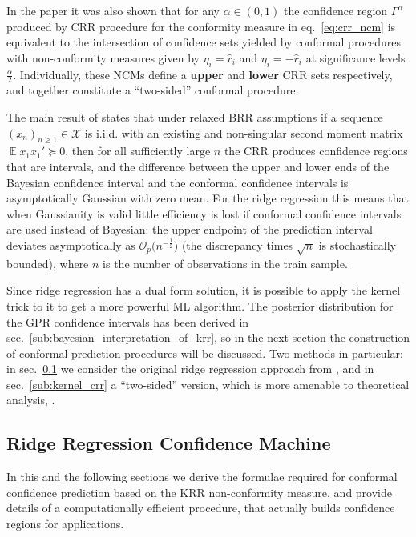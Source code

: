 \documentclass[a4paper,14pt]{extarticle}
\newcommand{\ex}{\mathop{\mathbb{E}}\nolimits}
\newcommand{\Xcal}{\mathcal{X}}
\begin{document}
In the paper it was also shown that for any $\alpha\in(0,1)$ the confidence
region $\Gamma^\alpha$ produced by CRR procedure for the conformity measure in
eq.~\ref{eq:crr_ncm} is equivalent to the intersection of confidence sets yielded
by conformal procedures with non-conformity measures given by $\eta_i = \hat{r}_i$
and $\eta_i = -\hat{r}_i$ at significance levels $\frac{\alpha}{2}$. Individually,
these NCMs define a \textbf{upper} and \textbf{lower} CRR sets respectively, and
together constitute a ``two-sided'' conformal procedure.

The main result of \cite{burnaevV14} states that under relaxed BRR assumptions if
a sequence $(x_n)_{n\geq1}\in\Xcal$ is i.i.d. with an existing and non-singular second
moment matrix $\ex x_1x_1' \succeq 0$, then for all sufficiently large $n$ the CRR
produces confidence regions that are intervals, and the difference between the upper
and lower ends of the Bayesian confidence interval and the conformal confidence
intervals is asymptotically Gaussian with zero mean. For the ridge regression this
means that when Gaussianity is valid little efficiency is lost if conformal confidence
intervals are used instead of Bayesian: the upper endpoint of the prediction interval
deviates asymptotically as $\mathcal{O}_p\bigl(n^{-\frac{1}{2}}\bigr)$ (the discrepancy
times $\sqrt{n}$ is stochastically bounded), where $n$ is the number of observations
in the train sample.

Since ridge regression has a dual form solution, it is possible to apply the kernel
trick to it to get a more powerful ML algorithm. The posterior distribution for the
GPR confidence intervals has been derived in sec.~\ref{sub:bayesian_interpretation_of_krr},
so in the next section the construction of conformal prediction procedures will be
discussed. Two methods in particular: in sec.~\ref{sub:ridge_regression_confidence_machine}
we consider the original ridge regression approach from \cite{vovk2005}, and in
sec.~\ref{sub:kernel_crr} a ``two-sided'' version, which is more amenable to theoretical
analysis, \cite{burnaevV14}.


\subsection{Ridge Regression Confidence Machine} %
\label{sub:ridge_regression_confidence_machine}

In this and the following sections we derive the formulae required for conformal
confidence prediction based on the KRR non-conformity measure, and provide details
of a computationally efficient procedure, that actually builds confidence regions
for applications.
\end{document}
